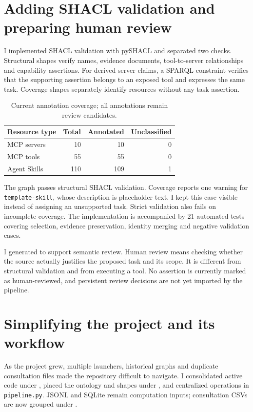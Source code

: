\documentclass[11pt,a4paper]{article}
\begin{document}
\section{Adding SHACL validation and preparing human review}

I implemented SHACL validation with pySHACL and separated two checks. Structural shapes verify names, evidence documents, tool-to-server relationships and capability assertions. For derived server claims, a SPARQL constraint verifies that the supporting assertion belongs to an exposed tool and expresses the same task. Coverage shapes separately identify resources without any task assertion.

\begin{table}[htbp]
\centering
\caption{Current annotation coverage; all annotations remain review candidates.}
\begin{tabular}{lrrr}
\toprule
\textbf{Resource type} & \textbf{Total} & \textbf{Annotated} & \textbf{Unclassified} \\
\midrule
MCP servers & 10 & 10 & 0 \\
MCP tools & 55 & 55 & 0 \\
Agent Skills & 110 & 109 & 1 \\
\bottomrule
\end{tabular}
\end{table}

The graph passes structural SHACL validation. Coverage reports one warning for \texttt{template-skill}, whose description is placeholder text. I kept this case visible instead of assigning an unsupported task. Strict validation also fails on incomplete coverage. The implementation is accompanied by 21 automated tests covering selection, evidence preservation, identity merging and negative validation cases.

I generated  to support semantic review. Human review means checking whether the source actually justifies the proposed task and its scope. It is different from structural validation and from executing a tool. No assertion is currently marked as human-reviewed, and persistent review decisions are not yet imported by the pipeline.

\section{Simplifying the project and its workflow}

As the project grew, multiple launchers, historical graphs and duplicate consultation files made the repository difficult to navigate. I consolidated active code under , placed the ontology and shapes under , and centralized operations in \texttt{pipeline.py}. JSONL and SQLite remain computation inputs; consultation CSVs are now grouped under .
\end{document}
